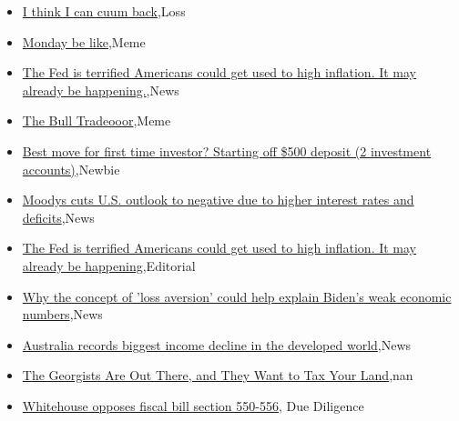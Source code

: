 \documentclass{article}%
\begin{document}
%
\begin{itemize}%
\item%
\href{https://reddit.com/r/wallstreetbets/comments/17u5a47/i\_think\_i\_can\_cuum\_back/}{I think I can cuum back},Loss%
\item%
\href{https://reddit.com/r/wallstreetbets/comments/17u520l/monday\_be\_like/}{Monday be like},Meme%
\item%
\href{https://reddit.com/r/wallstreetbets/comments/17u3rkf/the\_fed\_is\_terrified\_americans\_could\_get\_used\_to/}{The Fed is terrified Americans could get used to high inflation. It may already be happening.},News%
\item%
\href{https://reddit.com/r/wallstreetbets/comments/17u3f75/the\_bull\_tradeooor/}{The Bull Tradeooor},Meme%
\item%
\href{https://reddit.com/r/StockMarket/comments/17t3xys/best\_move\_for\_first\_time\_investor\_starting\_off/}{Best move for first time investor? Starting off \$500 deposit (2 investment accounts)},Newbie%
\item%
\href{https://reddit.com/r/StockMarket/comments/17sfdpe/moodys\_cuts\_us\_outlook\_to\_negative\_due\_to\_higher/}{Moodys cuts U.S. outlook to negative due to higher interest rates and deficits},News%
\item%
\href{https://reddit.com/r/Economics/comments/17u1208/the\_fed\_is\_terrified\_americans\_could\_get\_used\_to/}{The Fed is terrified Americans could get used to high inflation. It may already be happening},Editorial%
\item%
\href{https://reddit.com/r/Economics/comments/17tzo4j/why\_the\_concept\_of\_loss\_aversion\_could\_help/}{Why the concept of 'loss aversion' could help explain Biden's weak economic numbers},News%
\item%
\href{https://reddit.com/r/Economics/comments/17tw0y3/australia\_records\_biggest\_income\_decline\_in\_the/}{Australia records biggest income decline in the developed world},News%
\item%
\href{https://reddit.com/r/Economics/comments/17tq7g5/the\_georgists\_are\_out\_there\_and\_they\_want\_to\_tax/}{The Georgists Are Out There, and They Want to Tax Your Land},nan%
\item%
\href{https://reddit.com/r/Superstonk/comments/17u02rj/whitehouse\_opposes\_fiscal\_bill\_section\_550556/}{Whitehouse opposes fiscal bill section 550-556}, Due Diligence%
\end{itemize}%
\end{document}
